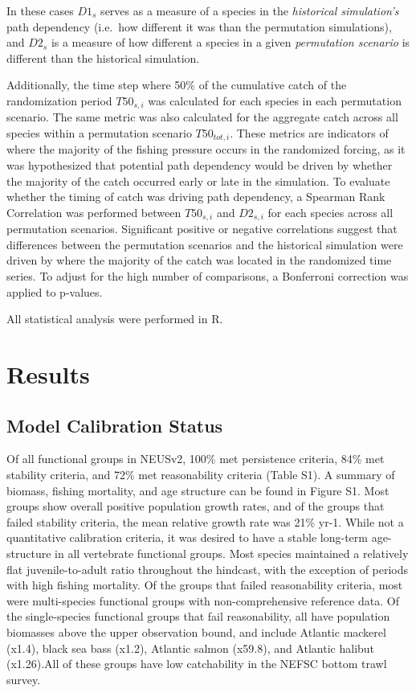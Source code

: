 \documentclass[
]{article}
\begin{document}
In these cases \(D1_s\) serves as a measure of a species in the \emph{historical simulation's} path dependency (i.e.~how different it was than the permutation simulations), and \(D2_s\) is a measure of how different a species in a given \emph{permutation scenario} is different than the historical simulation.

Additionally, the time step where 50\% of the cumulative catch of the randomization period \(T50_{s,i}\) was calculated for each species in each permutation scenario. The same metric was also calculated for the aggregate catch across all species within a permutation scenario \(T50_{tot,i}\). These metrics are indicators of where the majority of the fishing pressure occurs in the randomized forcing, as it was hypothesized that potential path dependency would be driven by whether the majority of the catch occurred early or late in the simulation. To evaluate whether the timing of catch was driving path dependency, a Spearman Rank Correlation was performed between \(T50_{s,i}\) and \(D2_{s,i}\) for each species across all permutation scenarios. Significant positive or negative correlations suggest that differences between the permutation scenarios and the historical simulation were driven by where the majority of the catch was located in the randomized time series. To adjust for the high number of comparisons, a Bonferroni correction was applied to p-values.

All statistical analysis were performed in R.

\section{Results}\label{results}

\subsection{Model Calibration Status}\label{model-calibration-status}

Of all functional groups in NEUSv2, 100\% met persistence criteria, 84\% met stability criteria, and 72\% met reasonability criteria (Table S1). A summary of biomass, fishing mortality, and age structure can be found in Figure S1. Most groups show overall positive population growth rates, and of the groups that failed stability criteria, the mean relative growth rate was 21\% yr-1. While not a quantitative calibration criteria, it was desired to have a stable long-term age-structure in all vertebrate functional groups. Most species maintained a relatively flat juvenile-to-adult ratio throughout the hindcast, with the exception of periods with high fishing mortality. Of the groups that failed reasonability criteria, most were multi-species functional groups with non-comprehensive reference data. Of the single-species functional groups that fail reasonability, all have population biomasses above the upper observation bound, and include Atlantic mackerel (x1.4), black sea bass (x1.2), Atlantic salmon (x59.8), and Atlantic halibut (x1.26).All of these groups have low catchability in the NEFSC bottom trawl survey.
\end{document}
